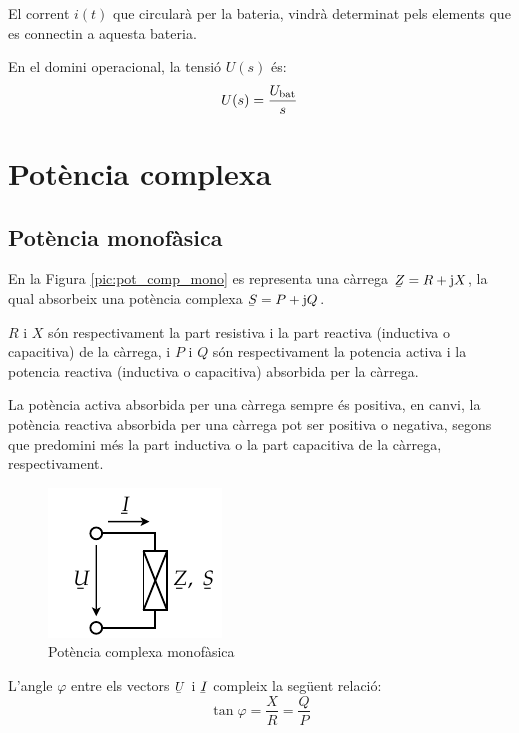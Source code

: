 El corrent $i(t)$ que circular\`{a} per la bateria, vindr\`{a} determinat
pels elements que es connectin a aquesta bateria.

 En el domini operacional, la
tensi\'{o} $U(s)$ \'{e}s:
\begin{equation}
   U(s) = \frac{U_\mathrm{bat}}{s}
\end{equation}

\section{Pot\`{e}ncia complexa}\label{sec:pot_complex} 

\subsection{Pot\`{e}ncia monof\`{a}sica} 

En la Figura \vref{pic:pot_comp_mono} es representa una c\`{a}rrega $\cmplx{Z}=R+\ju X$, la
qual absorbeix una pot\`{e}ncia complexa $\cmplx{S} = P + \ju Q$.

$R$ i $X$ s\'{o}n respectivament la part resistiva i la part reactiva
(inductiva o capacitiva) de la c\`{a}rrega, i $P$ i $Q$ s\'{o}n
respectivament la potencia activa i la potencia reactiva (inductiva
o capacitiva) absorbida per la c\`{a}rrega.

La pot\`{e}ncia activa absorbida per una c\`{a}rrega sempre \'{e}s positiva, en
canvi, la pot\`{e}ncia reactiva absorbida per una c\`{a}rrega pot ser
positiva o negativa, segons que predomini m\'{e}s la part inductiva o la
part capacitiva de la c\`{a}rrega, respectivament.

\begin{figure}[htb]
\centering
    \includegraphics{Imatges/Cap-Fonaments-Potencia-Monof.pdf}
\caption{Pot\`{e}ncia complexa monof\`{a}sica} \label{pic:pot_comp_mono}
\end{figure}

L'angle $\varphi$ entre els vectors $\cmplx{U}$ i $\cmplx{I}$ compleix la seg\"{u}ent relaci\'{o}:
\begin{equation}
   \tan\varphi = \frac{X}{R} = \frac{Q}{P}
\end{equation}


